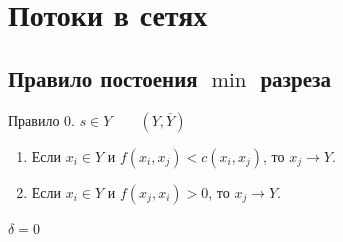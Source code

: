\chapter*{Потоки в сетях}


\section{Правило постоения $\min$ разреза}

Правило 0. $s \in Y \qquad (Y,\overline{Y})$

\begin{enumerate}
  \item Если $x_i \in Y$ и $f(x_i,x_j) < c(x_i,x_j)$, то $x_j \rightarrow Y$.
    \item Если $x_i \in Y$ и $f(x_j,x_i) > 0$, то $x_j \rightarrow Y$.
\end{enumerate}

\begin{eg}
  $\delta = 0$
  \begin{figure}[H]
		\centering
		\label{fig:fig-01}
	\end{figure}
\end{eg}
